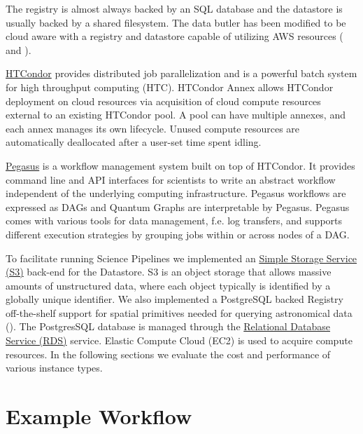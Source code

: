 \documentclass[a4paper, 10pt, conference]{ieeeconf}
\begin{document}
The registry is almost always backed by an SQL database and the datastore is usually backed by a shared filesystem. The data butler has been modified to be cloud aware with a registry and datastore capable of utilizing AWS resources (\cite{dmtn114} and \cite{dmtn137}).

\href{https://research.cs.wisc.edu/htcondor}{HTCondor} \cite{Thain:2005:HTCondor} provides distributed job parallelization and is a powerful batch system for high throughput computing (HTC). HTCondor Annex allows HTCondor deployment on cloud resources via acquisition of cloud compute resources external to an existing HTCondor pool. A pool can have multiple annexes, and each annex manages its own lifecycle. Unused compute resources are automatically deallocated after a user-set time spent idling. 

\href{https://pegasus.isi.edu/}{Pegasus} \cite{Deelman:2015:Pegasus} is a workflow management system built on top of HTCondor.
It provides command line and API interfaces for scientists to write an abstract workflow independent of the underlying computing infrastructure. Pegasus workflows are expressed as DAGs and Quantum Graphs are interpretable by Pegasus. Pegasus comes with various tools for data management, f.e. log transfers, and supports different execution strategies by grouping jobs within or across nodes of a DAG.

To facilitate running Science Pipelines we implemented an \href{https://aws.amazon.com/s3/}{Simple Storage Service (S3)} back-end for the Datastore. S3 is an object storage that allows massive amounts of unstructured data, where each object typically is identified by a globally unique identifier. We also implemented a PostgreSQL backed Registry off-the-shelf support for spatial primitives needed for querying astronomical data (\cite{PostGIS}). The PostgresSQL database is managed through the \href{https://aws.amazon.com/rds/}{Relational Database Service (RDS)} service.
Elastic Compute Cloud (EC2) is used to acquire compute resources.  In the following sections we evaluate the cost and performance of various instance types.

\section{Example Workflow}
\end{document}
